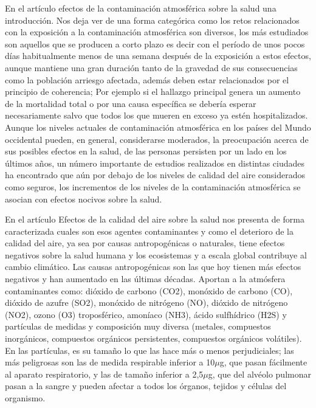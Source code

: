 En el artículo efectos de la contaminación atmosférica sobre la salud una introducción. Nos deja ver de una forma categórica como los retos relacionados con la exposición a la contaminación atmosférica son diversos, los más estudiados son aquellos que se producen a corto plazo es decir con el período de unos pocos días habitualmente menos de una semana después de la exposición a estos efectos, aunque mantiene una gran duración tanto de la gravedad de sus consecuencias como la población arriesgo afectada, además deben estar relacionados por el principio de coherencia; Por ejemplo si el hallazgo principal genera un aumento de la mortalidad total o por una causa específica se debería esperar necesariamente salvo que todos los que mueren en exceso ya estén hospitalizados. 
Aunque los niveles actuales de contaminación atmosférica en los países del Mundo occidental pueden, en general, considerarse moderados, la preocupación acerca de sus posibles efectos en la salud, de las personas persisten por un lado en los últimos años, un número importante de estudios realizados en distintas ciudades ha encontrado que aún por debajo de los niveles de calidad del aire considerados como seguros, los incrementos de los niveles de la contaminación atmosférica se asocian con efectos nocivos sobre la salud.\cite{BALLESTERDIEZ1999}

En el artículo Efectos de la calidad del aire sobre la salud nos presenta de forma caracterizada cuales son esos agentes contaminantes y como el deterioro de la calidad del aire, ya sea por causas antropogénicas o naturales, tiene efectos negativos sobre la salud humana y los ecosistemas y a escala global contribuye al cambio climático. Las causas antropogénicas son las que hoy tienen más efectos negativos y han aumentado en las últimas décadas. Aportan a la atmósfera contaminantes como: dióxido de carbono (CO2), monóxido de carbono (CO), dióxido de azufre (SO2), monóxido de nitrógeno (NO), dióxido de nitrógeno (NO2), ozono (O3) troposférico, amoníaco (NH3), ácido sulfhídrico (H2S) y partículas de medidas y composición muy diversa (metales, compuestos inorgánicos, compuestos orgánicos persistentes, compuestos orgánicos volátiles). En las partículas, es su tamaño lo que las hace más o menos perjudiciales; las más peligrosas son las de medida respirable inferior a 10$\mu$g, que pasan fácilmente al aparato respiratorio, y las de tamaño inferior a 2,5$\mu$g, que del alvéolo pulmonar pasan a la sangre y pueden afectar a todos los órganos, tejidos y células del organismo.\cite{MARTIVALLS2017511}

